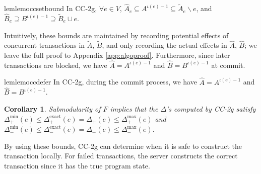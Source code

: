 \documentclass{article} %
\newcommand{\hogwild}{CF-2g}
\newcommand{\occ}{CC-2g}
\newtheorem{cor}[thm]{Corollary}
\newcommand{\algref}[1]{Alg.~\ref{#1}}
\begin{document}
\begin{restatable}{lem}{lemoccsetbound}\label{lem:occ:set_bound}
In \occ{}, $\forall e\in V$,
$\hat{A}_e \subseteq A^{\iota(e)-1} \subseteq \tilde{A}_e \backslash e$, and $\hat{B}_e \supseteq B^{\iota(e)-1} \supseteq \tilde{B}_e \cup e$.
\end{restatable}
Intuitively, these bounds are maintained by recording potential effects of concurrent transactions in $\tilde{A}$, $\tilde{B}$, and only recording the actual effects in $\hat{A}$, $\hat{B}$;
we leave the full proof to Appendix \ref{app:algoproof}.
Furthermore, since later transactions are blocked, we have $\hat{A} = A^{\iota(e)-1}$ and $\hat{B} = B^{\iota(e)-1}$ at commit.

\begin{restatable}{lem}{lemoccdefer}\label{lem:occ:defer}
In \occ{}, during the commit process, we have $\hat{A} = A^{\iota(e)-1}$ and $\hat{B} = B^{\iota(e)-1}$.
\end{restatable}


\begin{cor}\label{cor:occ:delta_bound} Submodularity of $F$ implies that the $\Delta$'s computed by \occ{} satisfy $\Delta_+^{\min}(e) \leq \Delta_+^{\text{exact}}(e) = \Delta_+(e) \leq \Delta_+^{\max}(e)$ and $\Delta_-^{\min}(e) \leq \Delta_-^{\text{exact}}(e) = \Delta_-(e) \leq \Delta_-^{\max}(e)$.
\end{cor}

By using these bounds, \occ{} can determine when it is safe to construct the transaction locally.
For failed transactions, the server constructs the correct transaction since it has the true program state.

\end{document}
